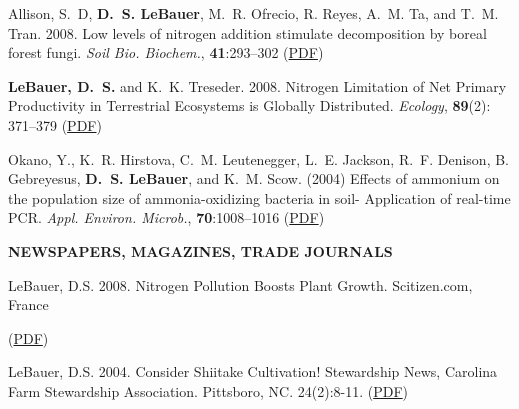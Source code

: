 \documentclass[12pt,twoside]{article}
\begin{document}
{\begin{itemize*}
\item \noindent%
Allison, S.~D, \textbf{D.~S. LeBauer}, M.~R. Ofrecio, R. Reyes, A.~M. Ta, and T.~M. Tran. 2008. Low levels of
nitrogen addition stimulate decomposition by boreal forest fungi. \textit{Soil Bio. Biochem.}, \textbf{41}:293--302
\ifpdf %
(\href{https://netfiles.uiuc.edu/dlebauer/www/allison2009qrc.pdf}{PDF})
\fi %

\item \noindent%
\textbf{LeBauer, D.~S.} and K.~K. Treseder. 2008. Nitrogen Limitation of Net Primary Productivity in
Terrestrial Ecosystems is Globally Distributed. \textit{Ecology}, \textbf{89}(2): 371--379
\ifpdf %
(\href{https://://netfiles.uiuc.edu/dlebauer/www/lebauer2008nln.pdf}{PDF})
\fi %

\item \noindent%
Okano, Y., K.~R. Hirstova, C.~M. Leutenegger, L.~E. Jackson, R.~F. Denison, B. Gebreyesus, \textbf{D.~S.
LeBauer}, and K.~M. Scow. (2004) Effects of ammonium on the population size of ammonia-oxidizing
bacteria in soil- Application of real-time PCR. \textit{Appl. Environ. Microb.}, \textbf{70}:1008--1016
\ifpdf %
(\href{https://://netfiles.uiuc.edu/dlebauer/www/okano2004art.pdf}{PDF})
\fi %
\end{itemize*}



\textbf{NEWSPAPERS, MAGAZINES, TRADE JOURNALS}
\begin{itemize*}
\item \noindent
LeBauer, D.S. 2008. Nitrogen Pollution Boosts Plant Growth. Scitizen.com, France

\ifpdf %
(\href{https://netfiles.uiuc.edu/dlebauer/www/IsikhuemhenLeBauer2004GrowingPleurotustuberregium.pdf}{PDF}) 
\fi %
\item \noindent%
 LeBauer, D.S. 2004. Consider Shiitake Cultivation! Stewardship News, Carolina Farm Stewardship Association. Pittsboro, NC. 24(2):8-11.
\ifpdf %
(\href{https://netfiles.uiuc.edu/dlebauer/www/LeBauer_2004_Consider_Shiitake_Cultivation.pdf}{PDF}) 
\fi %


\end{itemize*}}
\end{document}
